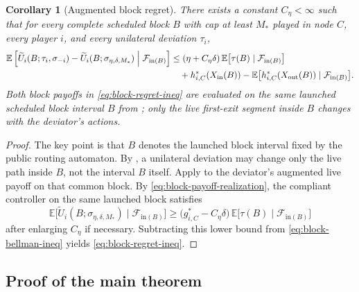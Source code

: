 \documentclass[12pt]{article}
\newtheorem{corollary}[theorem]{Corollary}
\theoremstyle{definition}
\newcommand{\E}{\mathbb{E}}
\newcommand{\1}{\mathbf{1}}
\newcommand{\cF}{\mathcal{F}}
\begin{document}
\begin{corollary}[Augmented block regret]
\label{cor:block-regret}
There exists a constant $C_\eta<\infty$ such that for every complete scheduled
block $B$ with cap at least $M_*$ played in node $C$, every player $i$, and
every unilateral deviation $\tau_i$,
\begin{equation}
\label{eq:block-regret-ineq}
\begin{aligned}
\E\left[
\widetilde U_i(B;\tau_i,\sigma_{-i})
-
\widetilde U_i(B;\sigma_{\eta,\delta,M_*})
\Bigm|\cF_{\mathrm{in}(B)}
\right]
&\le
(\eta+C_\eta\delta)\,\E\bigl[\tau(B)\mid\cF_{\mathrm{in}(B)}\bigr]
\\
&\quad+
h_{i,C}^*(X_{\mathrm{in}}(B))
-
\E\bigl[h_{i,C}^*(X_{\mathrm{out}}(B))\mid\cF_{\mathrm{in}(B)}\bigr].
\end{aligned}
\end{equation}
Both block payoffs in \eqref{eq:block-regret-ineq} are evaluated on the same
launched scheduled block interval $B$ from
; only the live first-exit segment inside $B$
changes with the deviator's actions.
\end{corollary}

\begin{proof}
The key point is that $B$ denotes the launched block interval fixed by the public
routing automaton. By , a unilateral
deviation may change only the live path inside $B$, not the interval $B$ itself.
Apply  to the deviator's augmented live payoff on that
common block. By \eqref{eq:block-payoff-realization}, the compliant controller on
the same launched block satisfies
\[
\E\bigl[\widetilde U_i(B;\sigma_{\eta,\delta,M_*})\mid\cF_{\mathrm{in}(B)}\bigr]
\ge
\bigl(g_{i,C}^*-C_\eta\delta\bigr)\,
\E\bigl[\tau(B)\mid\cF_{\mathrm{in}(B)}\bigr]
\]
after enlarging $C_\eta$ if necessary. Subtracting this lower bound from
\eqref{eq:block-bellman-ineq} yields \eqref{eq:block-regret-ineq}.
\end{proof}

\subsection{Proof of the main theorem}
\end{document}
